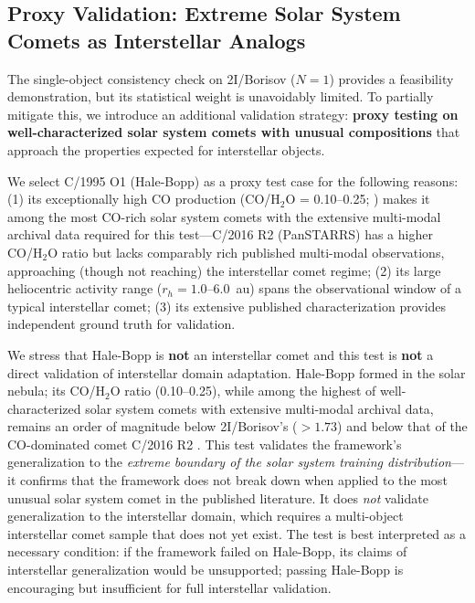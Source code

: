\documentclass[usenatbib]{mnras}
\begin{document}
\subsection{Proxy Validation: Extreme Solar System Comets as Interstellar Analogs}\label{sec:proxy}

The single-object consistency check on 2I/Borisov ($N=1$) provides a feasibility demonstration, but its statistical weight is unavoidably limited. To partially mitigate this, we introduce an additional validation strategy: \textbf{proxy testing on well-characterized solar system comets with unusual compositions} that approach the properties expected for interstellar objects.

We select C/1995 O1 (Hale-Bopp) as a proxy test case for the following reasons: (1) its exceptionally high CO production (CO/H$_2$O = 0.10--0.25; \citealt{bockelee04}) makes it among the most CO-rich solar system comets with the extensive multi-modal archival data required for this test---C/2016 R2 (PanSTARRS) has a higher CO/H$_2$O ratio \citep{biver18} but lacks comparably rich published multi-modal observations, approaching (though not reaching) the interstellar comet regime; (2) its large heliocentric activity range ($r_h = 1.0$--6.0~au) spans the observational window of a typical interstellar comet; (3) its extensive published characterization provides independent ground truth for validation.

We stress that Hale-Bopp is \textbf{not} an interstellar comet and this test is \textbf{not} a direct validation of interstellar domain adaptation. Hale-Bopp formed in the solar nebula; its CO/H$_2$O ratio (0.10--0.25), while among the highest of well-characterized solar system comets with extensive multi-modal archival data, remains an order of magnitude below 2I/Borisov's ($>1.73$) and below that of the CO-dominated comet C/2016 R2 \citep{biver18}. This test validates the framework's generalization to the \textit{extreme boundary of the solar system training distribution}---it confirms that the framework does not break down when applied to the most unusual solar system comet in the published literature. It does \textit{not} validate generalization to the interstellar domain, which requires a multi-object interstellar comet sample that does not yet exist. The test is best interpreted as a necessary condition: if the framework failed on Hale-Bopp, its claims of interstellar generalization would be unsupported; passing Hale-Bopp is encouraging but insufficient for full interstellar validation.
\end{document}
